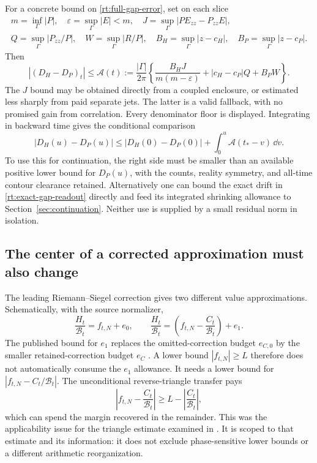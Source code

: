 For a concrete bound on \eqref{rt:full-gap-error}, set on each slice
\begin{gather*}
 m=\inf_\Gamma|P|,\quad \varepsilon=\sup_\Gamma|E|<m,\quad
 J=\sup_\Gamma|P E_{zz}-P_{zz}E|,\\
 Q=\sup_\Gamma|P_{zz}/P|,\quad W=\sup_\Gamma|R/P|,\quad
 B_H=\sup_\Gamma|z-c_H|,\quad B_P=\sup_\Gamma|z-c_P|.
\end{gather*}
Then
\begin{equation}
 |(D_H-D_P)_t|\le\mathcal A(t):=
 \frac{|\Gamma|}{2\pi}
 \left\{\frac{B_HJ}{m(m-\varepsilon)}
              +|c_H-c_P|Q+B_PW\right\}.
 \label{rt:gap-error-bound}
\end{equation}
The $J$ bound may be obtained directly from a coupled enclosure, or
estimated less sharply from paid separate jets.  The latter is a valid
fallback, with no promised gain from correlation.  Every denominator
floor is displayed.  Integrating in backward time gives the conditional
comparison
\begin{equation}
 |D_H(u)-D_P(u)|\le |D_H(0)-D_P(0)|
                      +\int_0^u\mathcal A(t_*-v)\,\dd v.
 \label{rt:integrated-gap-error}
\end{equation}
To use this for continuation, the right side must be smaller than an
available positive lower bound for $D_P(u)$, with the counts, reality
symmetry, and all-time contour clearance retained.  Alternatively one
can bound the exact drift in \eqref{rt:exact-gap-readout} directly and
feed its integrated shrinking allowance to Section~\ref{sec:continuation}.
Neither use is supplied by a small residual norm in isolation.

\subsection{The center of a corrected approximation must also change}

The leading Riemann--Siegel correction gives two different value
approximations.  Schematically, with the source normalizer,
\begin{equation}
 \frac{H_t}{\mathcal B_t}=f_{t,N}+e_0,
 \qquad
 \frac{H_t}{\mathcal B_t}
       =\left(f_{t,N}-\frac{C_t}{\mathcal B_t}\right)+e_1.
 \label{rt:corrected-centers}
\end{equation}
The published bound for $e_1$ replaces the omitted-correction budget
$e_{C,0}$ by the smaller retained-correction budget $e_C$
\cite[\S6, (69)--(70)]{Polymath2019}.  A lower bound $|f_{t,N}|\ge L$
therefore does not automatically consume the $e_1$ allowance.  It needs
a lower bound for $|f_{t,N}-C_t/\mathcal B_t|$.  The unconditional
reverse-triangle transfer pays
\begin{equation}
 \left|f_{t,N}-\frac{C_t}{\mathcal B_t}\right|
          \ge L-\left|\frac{C_t}{\mathcal B_t}\right|,
 \label{rt:correction-payment}
\end{equation}
which can spend the margin recovered in the remainder.  This was the
applicability issue for the triangle estimate examined in
\cite{NewmanCertificateAudit}.  It is scoped to that estimate and its
information: it does not exclude phase-sensitive lower bounds or a
different arithmetic reorganization.

